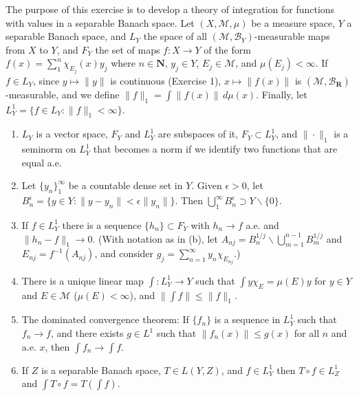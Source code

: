 \documentclass[12pt,a4paper]{article}
\begin{document}
\begin{problem}\label{prob:5-16}
The purpose of this exercise is to develop a theory of integration for functions with values in a separable Banach space. Let $(X, \mathcal{M}, \mu)$ be a measure space, $Y$ a separable Banach space, and $L_Y$ the space of all $(\mathcal{M}, \mathcal{B}_Y)$-measurable maps from $X$ to $Y$, and $F_Y$ the set of maps $f:X \rightarrow Y$ of the form $f(x) = \sum_{1}^{n} \chi_{E_j}(x) y_j$ where $n \in \mathbf{N}$, $y_j \in Y$, $E_j \in \mathcal{M}$, and $\mu(E_j) < \infty$. If $f \in L_Y$, since $y \mapsto \|y\|$ is continuous (Exercise 1), $x \mapsto \|f(x)\|$ is $(\mathcal{M},\mathcal{B}_{\mathbf{R}})$-measurable, and we define $\|f\|_1 = \int \|f(x)\|\,d\mu(x)$. Finally, let $L_Y^1 = \{f \in L_Y : \|f\|_1 < \infty\}$.
\begin{enumerate}[label=\alph*.]
\item $L_Y$ is a vector space, $F_Y$ and $L_Y^1$ are subspaces of it, $F_Y \subset L_Y^1$, and $\|\cdot\|_1$ is a seminorm on $L_Y^1$ that becomes a norm if we identify two functions that are equal a.e.
\item Let $\{y_n\}_{1}^{\infty}$ be a countable dense set in $Y$. Given $\epsilon > 0$, let $B_n^\epsilon = \{y \in Y : \|y-y_n\| < \epsilon \|y_n\|\}$. Then $\bigcup_{1}^{\infty} B_n^\epsilon \supset Y \backslash \{0\}$.
\item If $f \in L_Y^1$ there is a sequence $\{h_n\} \subset F_Y$ with $h_n \rightarrow f$ a.e. and $\|h_n-f\|_1 \rightarrow 0$. (With notation as in (b), let $A_{nj} = B_n^{1/j} \backslash \bigcup_{m=1}^{n-1} B_m^{1/j}$ and $E_{nj} = f^{-1}(A_{nj})$, and consider $g_j = \sum_{n=1}^{\infty} y_n \chi_{E_{nj}}$.)
\item There is a unique linear map $\int : L_Y^1 \rightarrow Y$ such that $\int y\chi_E = \mu(E)y$ for $y \in Y$ and $E \in \mathcal{M}$ ($\mu(E) < \infty$), and $\|\int f\| \le \|f\|_1$.
\item The dominated convergence theorem: If $\{f_n\}$ is a sequence in $L_Y^1$ such that $f_n \rightarrow f$, and there exists $g \in L^1$ such that $\|f_n(x)\| \le g(x)$ for all $n$ and a.e. $x$, then $\int f_n \rightarrow \int f$.
\item If $Z$ is a separable Banach space, $T \in L(Y,Z)$, and $f \in L_Y^1$ then $T \circ f \in L_Z^1$ and $\int T \circ f = T(\int f)$.
\end{enumerate}
\end{problem}
\end{document}
